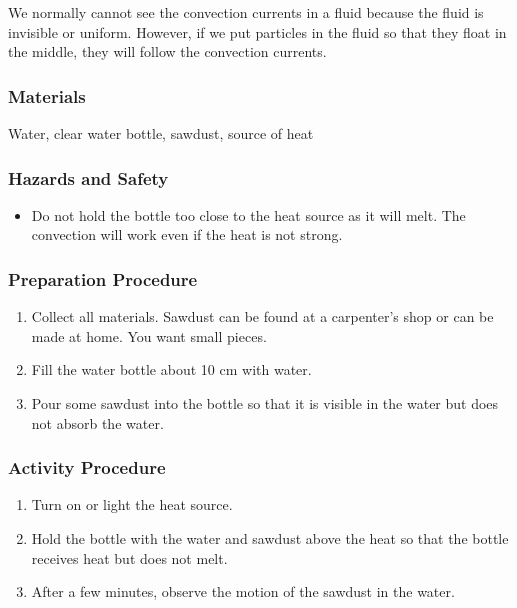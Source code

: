 We normally cannot see the convection currents in a fluid because the fluid is invisible or uniform.  However, if we put particles in the fluid so that they float in the middle, they will follow the convection currents.

\subsubsection*{Materials}
Water, clear water bottle, sawdust, source of heat

\subsubsection*{Hazards and Safety}
\begin{itemize}
\item{Do not hold the bottle too close to the heat source as it will melt.  The convection will work even if the heat is not strong.}
\end{itemize}

\subsubsection*{Preparation Procedure}
\begin{enumerate}
\item{Collect all materials.  Sawdust can be found at a carpenter's shop or can be made at home.  You want small pieces.}
\item{Fill the water bottle about 10 cm with water.}
\item{Pour some sawdust into the bottle so that it is visible in the water but does not absorb the water.}
\end{enumerate}

\subsubsection*{Activity Procedure}
\begin{enumerate}
\item{Turn on or light the heat source.}
\item{Hold the bottle with the water and sawdust above the heat so that the bottle receives heat but does not melt.}
\item{After a few minutes, observe the motion of the sawdust in the water.}
\end{enumerate}

